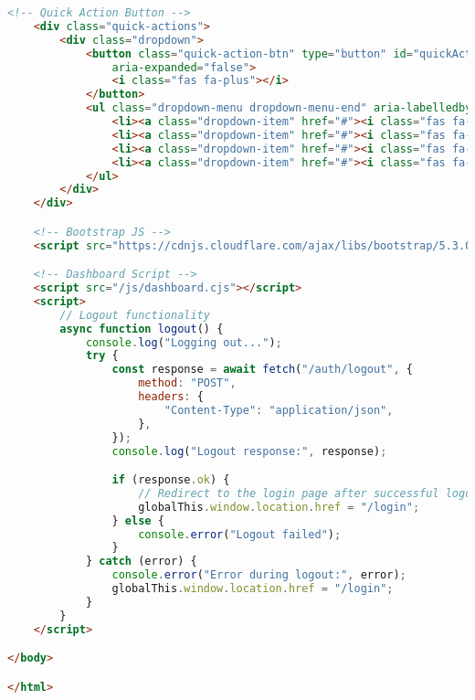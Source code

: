 \begin{lstlisting}[language=HTML]
    <!-- Quick Action Button -->
    <div class="quick-actions">
        <div class="dropdown">
            <button class="quick-action-btn" type="button" id="quickActionsDropdown" data-bs-toggle="dropdown"
                aria-expanded="false">
                <i class="fas fa-plus"></i>
            </button>
            <ul class="dropdown-menu dropdown-menu-end" aria-labelledby="quickActionsDropdown">
                <li><a class="dropdown-item" href="#"><i class="fas fa-exchange-alt me-2"></i> New Transfer</a></li>
                <li><a class="dropdown-item" href="#"><i class="fas fa-credit-card me-2"></i> Pay Bill</a></li>
                <li><a class="dropdown-item" href="#"><i class="fas fa-mobile-alt me-2"></i> Mobile Deposit</a></li>
                <li><a class="dropdown-item" href="#"><i class="fas fa-user-friends me-2"></i> Send to Friend</a></li>
            </ul>
        </div>
    </div>

    <!-- Bootstrap JS -->
    <script src="https://cdnjs.cloudflare.com/ajax/libs/bootstrap/5.3.0/js/bootstrap.bundle.min.js"></script>

    <!-- Dashboard Script -->
    <script src="/js/dashboard.cjs"></script>
    <script>
        // Logout functionality
        async function logout() {
            console.log("Logging out...");
            try {
                const response = await fetch("/auth/logout", {
                    method: "POST",
                    headers: {
                        "Content-Type": "application/json",
                    },
                });
                console.log("Logout response:", response);

                if (response.ok) {
                    // Redirect to the login page after successful logout
                    globalThis.window.location.href = "/login";
                } else {
                    console.error("Logout failed");
                }
            } catch (error) {
                console.error("Error during logout:", error);
                globalThis.window.location.href = "/login";
            }
        }
    </script>

</body>

</html>
\end{lstlisting}
